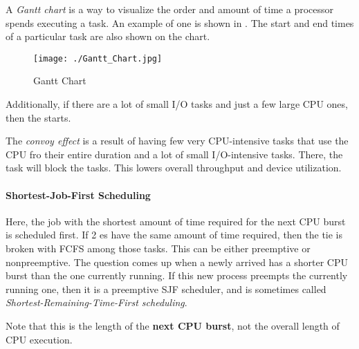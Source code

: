 \begin{definition}\label{def:Gantt_Chart}
  A \emph{Gantt chart} is a way to visualize the order and amount of time a processor spends executing a task.
  An example of one is shown in .
  The start and end times of a particular task are also shown on the chart.
\end{definition}

\begin{figure}[h!tbp]
  \centering
  \texttt{[image: ./Gantt\_Chart.jpg]}
  \caption{Gantt Chart}
  \label{fig:Gantt_Chart}
\end{figure}

Additionally, if there are a lot of small I/O tasks and just a few large CPU ones, then the  starts.

\begin{definition}\label{def:Convoy_Effect}
  The \emph{convoy effect} is a result of having few very CPU-intensive tasks that use the CPU fro their entire duration and a lot of small I/O-intensive tasks.
  There, the  task will block the  tasks.
  This lowers overall throughput and device utilization.
\end{definition}

\paragraph{Shortest-Job-First Scheduling}\label{par:SJF_Scheduling}
Here, the job with the shortest amount of time required for the next CPU burst is scheduled first.
If 2 es have the same amount of time required, then the tie is broken with FCFS among those tasks.
This can be either preemptive or nonpreemptive.
The question comes up when a newly arrived  has a shorter CPU burst than the one currently running.
If this new process preempts the currently running one, then it is a preemptive SJF scheduler, and is sometimes called \emph{Shortest-Remaining-Time-First scheduling}.

\begin{blackbox}
  Note that this is the length of the \textbf{next CPU burst}, not the overall length of CPU execution.
\end{blackbox}

